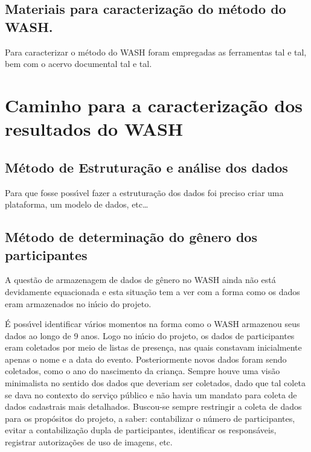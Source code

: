 \documentclass[
12pt,		%
openright,	%
twoside,  %
a4paper,			%
chapter=TITLE,		%
english,			%
french,				%
spanish,			%
brazil				%
]{USPSC-classe/USPSC_RedarTex}
\begin{document}
\subsection[Materiais para caracteriza\c{c}\~ao do m\'etodo do WASH.]{Materiais para caracteriza\c{c}\~ao do m\'etodo do WASH.}\label{Materiais para caracteriza\c{c}\~ao do m\'etodo do WASH.}
Para caracterizar o m\'etodo do WASH foram empregadas as ferramentas tal e tal, bem com o acervo documental tal e tal.








\section[Caminho para a caracteriza\c{c}\~ao dos resultados do WASH]{Caminho para a caracteriza\c{c}\~ao dos resultados do WASH}\label{Caminho para a caracteriza\c{c}\~ao dos resultados do WASH}
\subsection[M\'etodo de Estrutura\c{c}\~ao e an\'alise dos dados]{M\'etodo de Estrutura\c{c}\~ao e an\'alise dos dados}\label{M\'etodo de Estrutura\c{c}\~ao e an\'alise dos dados}
Para que fosse poss\'{\i}vel fazer a estrutura\c{c}\~ao dos dados foi preciso criar uma plataforma, um modelo de dados, etc…








\subsection[M\'etodo de determina\c{c}\~ao do g\^enero dos participantes]{M\'etodo de determina\c{c}\~ao do g\^enero dos participantes}\label{M\'etodo de determina\c{c}\~ao do g\^enero dos participantes}
A quest\~ao de armazenagem de dados de g\^enero no WASH ainda n\~ao est\'a devidamente equacionada e esta situa\c{c}\~ao tem a ver com a forma como os dados eram armazenados no in\'{\i}cio do projeto.








\'E poss\'{\i}vel identificar v\'arios momentos na forma como o WASH armazenou seus dados ao longo de 9 anos. Logo no in\'{\i}cio do projeto, os dados de participantes eram coletados por meio de listas de presen\c{c}a, nas quais constavam inicialmente apenas o nome e a data do evento. Posteriormente novos dados foram sendo coletados, como o ano do nascimento da crian\c{c}a. Sempre houve uma vis\~ao minimalista no sentido dos dados que deveriam ser coletados, dado que tal coleta se dava no contexto do servi\c{c}o p\'ublico e n\~ao havia um mandato para coleta de dados cadastrais mais detalhados. Buscou-se sempre restringir a coleta de dados para os prop\'ositos do projeto, a saber: contabilizar o n\'umero de participantes, evitar a contabiliza\c{c}\~ao dupla de participantes, identificar os respons\'aveis, registrar autoriza\c{c}\~oes de uso de imagens, etc.
\end{document}
